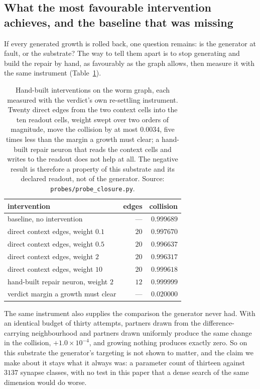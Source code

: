 \documentclass[11pt]{article}
\theoremstyle{remark}
\begin{document}
\subsection{What the most favourable intervention achieves, and the baseline that was missing}
\label{sec:ceiling}

If every generated growth is rolled back, one question remains: is the generator at fault, or the
substrate? The way to tell them apart is to stop generating and build the repair by hand, as
favourably as the graph allows, then measure it with the same instrument
(Table~\ref{tab:ceiling}).

\begin{table}[t]
\centering
\small
\caption{Hand-built interventions on the worm graph, each measured with the verdict's own
re-settling instrument. Twenty direct edges from the two context cells into the ten readout cells,
weight swept over two orders of magnitude, move the collision by at most $0.0034$, five times less
than the margin a growth must clear; a hand-built repair neuron that reads the context cells and
writes to the readout does not help at all. The negative result is therefore a property of this
substrate and its declared readout, not of the generator. Source:
\texttt{probes/probe\_closure.py}.}
\label{tab:ceiling}
\begin{tabular}{lrr}
\toprule
intervention & edges & collision \\
\midrule
baseline, no intervention & --- & $0.999689$ \\
direct context edges, weight $0.1$ & $20$ & $0.997670$ \\
direct context edges, weight $0.5$ & $20$ & $0.996637$ \\
direct context edges, weight $2$ & $20$ & $0.996317$ \\
direct context edges, weight $10$ & $20$ & $0.999618$ \\
hand-built repair neuron, weight $2$ & $12$ & $0.999999$ \\
\midrule
verdict margin a growth must clear & --- & $0.020000$ \\
\bottomrule
\end{tabular}
\end{table}

The same instrument also supplies the comparison the generator never had. With an identical budget
of thirty attempts, partners drawn from the difference-carrying neighbourhood and partners drawn
uniformly produce the same change in the collision, $+1.0\times10^{-4}$, and growing nothing
produces exactly zero. So on this substrate the generator's targeting is not shown to matter, and
the claim we make about it stays what it always was: a parameter count of thirteen against $3137$
synapse classes, with no test in this paper that a dense search of the same dimension would do
worse.
\end{document}
